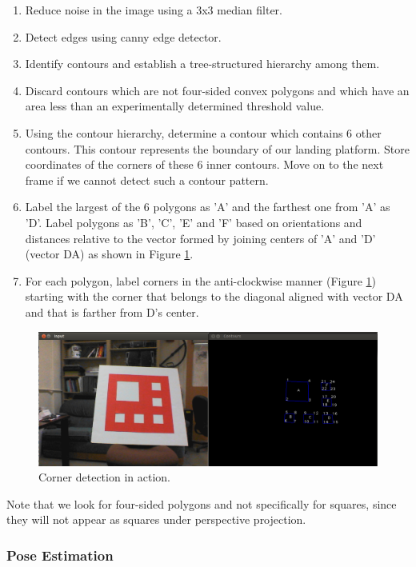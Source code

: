 \documentclass[10pt]{scrartcl} %
\begin{document}
\begin{enumerate}
\item{Reduce noise in the image using a 3x3 median filter.}
\item{Detect edges using canny edge detector.}
\item{Identify contours and establish a tree-structured hierarchy among them.}
\item{Discard contours which are not four-sided convex polygons and which have an area
	less than an experimentally determined threshold value.}
\item{Using the contour hierarchy, determine a contour which contains 6 other contours.
	This contour represents the boundary of our landing platform. Store coordinates of
	the corners of these 6 inner contours. Move on to the next frame if we cannot detect 
	such a contour pattern.}
\item{Label the largest of the 6 polygons as 'A' and the farthest one from 'A' as 'D'.
	Label polygons as 'B', 'C', 'E' and 'F' based on orientations and distances relative
	to the vector formed by joining centers of 'A' and 'D' (vector DA) as shown in 
	Figure \ref{fig:corners}.}
\item{For each polygon, label corners in the anti-clockwise manner (Figure \ref{fig:corners})
	starting with the corner that belongs to the diagonal aligned with vector DA and that is 
	farther from D's center.}
\end{enumerate}

\begin{figure}[h]
    \centering
    \includegraphics[width=\textwidth]{images/corners.png}
    \caption{Corner detection in action.}
    \label{fig:corners}
\end{figure}

Note that we look for four-sided polygons and not specifically for squares, since they
will not appear as squares under perspective projection.

\subsubsection{Pose Estimation}
\end{document}
